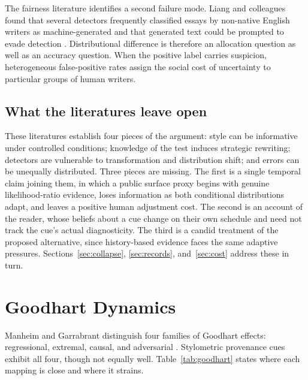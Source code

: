 \documentclass[11pt]{article}
\theoremstyle{plain}
\theoremstyle{definition}
\theoremstyle{remark}
\begin{document}
The fairness literature identifies a second failure mode. Liang and colleagues found that several detectors frequently classified essays by non-native English writers as machine-generated and that generated text could be prompted to evade detection \cite{liang2023}. Distributional difference is therefore an allocation question as well as an accuracy question. When the positive label carries suspicion, heterogeneous false-positive rates assign the social cost of uncertainty to particular groups of human writers.

\subsection{What the literatures leave open}

These literatures establish four pieces of the argument: style can be informative under controlled conditions; knowledge of the test induces strategic rewriting; detectors are vulnerable to transformation and distribution shift; and errors can be unequally distributed. Three pieces are missing. The first is a single temporal claim joining them, in which a public surface proxy begins with genuine likelihood-ratio evidence, loses information as both conditional distributions adapt, and leaves a positive human adjustment cost. The second is an account of the reader, whose beliefs about a cue change on their own schedule and need not track the cue's actual diagnosticity. The third is a candid treatment of the proposed alternative, since history-based evidence faces the same adaptive pressures. Sections~\ref{sec:collapse}, \ref{sec:records}, and~\ref{sec:cost} address these in turn.

\section{Goodhart Dynamics}\label{sec:goodhart}

Manheim and Garrabrant distinguish four families of Goodhart effects: regressional, extremal, causal, and adversarial \cite{manheim2019}. Stylometric provenance cues exhibit all four, though not equally well. Table~\ref{tab:goodhart} states where each mapping is close and where it strains.
\end{document}
